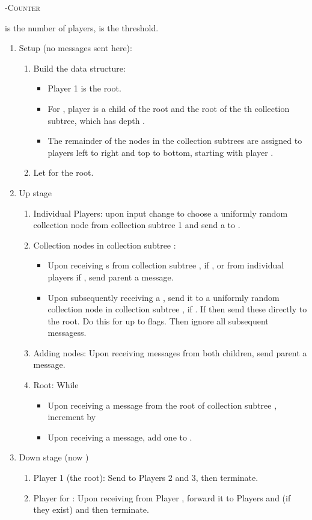 \documentclass[10pt]{llncs}
\newcommand{\flag}{\xspace}
\newcommand{\countm}{\xspace}
\newcommand{\done}{\xspace}
\newcommand{\tc}{\textsc{-Counter}\xspace}
\begin{document}
\begin{algorithm}
\caption{\tc}
 is the number of players,   is the threshold. 

\begin{enumerate}
\item Setup (no messages sent here):
\begin{enumerate}
\item Build the data structure: 
\begin{itemize}
\item Player 1 is the root. 
\item For , player  is a child of the root and 
the root of the th collection subtree, which has depth . 
\item The remainder of the nodes in the collection subtrees are assigned to 
players
left to right and top to bottom, starting with player .
\end{itemize}
\item Let  for the root.
\end{enumerate}
\item Up stage 
\begin{enumerate}
\item Individual Players: upon input change to  choose a 
uniformly random collection node  from collection subtree 1 and
send a \flag to .
\item Collection nodes in collection subtree : 
\begin{itemize}
\item Upon receiving  {\flag}s from collection subtree , 
if , 
or from  individual players
if , 
send parent a \countm message.
\item Upon subsequently receiving a \flag, send it to a uniformly random 
collection node  in collection subtree , if .  
If  then send 
these directly to the root. Do this for up to  
flags. Then ignore all subsequent \flag messagess.
\end{itemize}     
\item Adding nodes: Upon receiving \countm  
messages from both children, send parent 
a \countm message.
\item Root:  While 
\begin{itemize}
\item Upon receiving a \countm message from the root of collection subtree ,
increment  by  
\item Upon receiving a \flag message, add one to .
\end{itemize} 
\end{enumerate}
\item Down stage (now )
\begin{enumerate}
\item Player 1 (the root):  Send \done to Players 2 and 3, then terminate.
\item Player  for : Upon receiving \done from Player 
, forward it to Players  and  (if they exist) 
and then terminate.
\end{enumerate}
\end{enumerate}
\label{alg:tc}
\end{algorithm}
\end{document}
